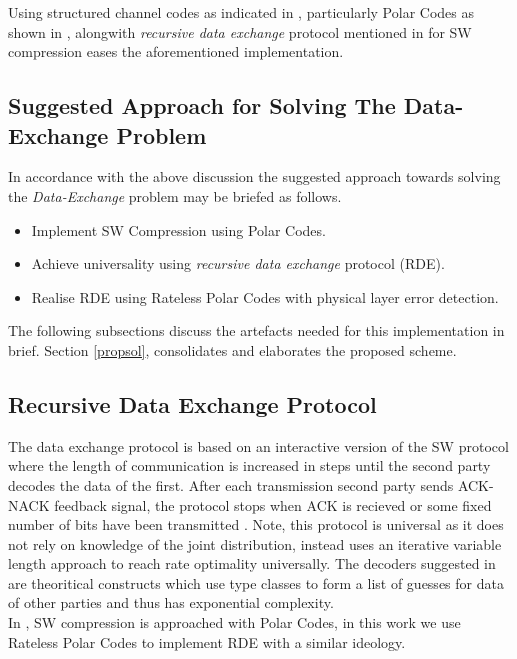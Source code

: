 \documentclass[
11pt, %
a4paper, %
oneside, %
headinclude,footinclude, %
BCOR5mm, %
]{scrartcl}
\begin{document}
Using structured channel codes as indicated in \cite{discus}, particularly Polar Codes as shown in \cite{pslep}, alongwith \emph{recursive data exchange} protocol  mentioned in \cite{htsw} for SW compression eases the aforementioned implementation. 

\subsection{Suggested Approach for Solving The Data-Exchange Problem}\label{suggapp}
In accordance with the above discussion the suggested approach towards solving the \emph{Data-Exchange} problem may be briefed as follows.
\begin{itemize}
\item{Implement SW Compression using Polar Codes.}
\item{Achieve universality using \emph{recursive data exchange} protocol (RDE).}
\item{Realise RDE using Rateless Polar Codes with physical layer error detection.}
\end{itemize}

The following subsections discuss the artefacts needed for this implementation in brief. Section \ref{propsol}, consolidates and elaborates the proposed scheme. 

\subsection{Recursive Data Exchange Protocol}
The data exchange protocol is based on an interactive version of the SW protocol where the length of communication is increased in steps until the second party decodes the data of the first. After each transmission second party sends ACK-NACK feedback signal, the protocol stops when ACK is recieved or some fixed number of bits have been transmitted \cite{htsw}. Note, this protocol is universal as it does not rely on knowledge of the joint distribution, instead uses an iterative variable length approach to reach rate optimality universally. The decoders suggested in \cite{htsw} are theoritical constructs which use type classes to form a list of guesses for data of other parties and thus has exponential complexity.\\ In \cite{pslep}, SW compression is approached with Polar Codes, in this work we use Rateless Polar Codes to implement RDE with a similar ideology.
\clearpage
\end{document}
